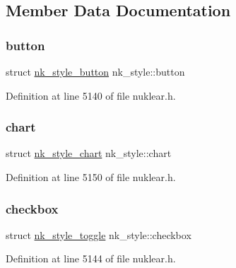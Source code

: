 \subsection{Member Data Documentation}
\mbox{\label{structnk__style_a42b97653cc5b81ff97432e40fdf47026}} 
\subsubsection{\texorpdfstring{button}{button}}
{\footnotesize\ttfamily struct \mbox{\hyperlink{structnk__style__button}{nk\+\_\+style\+\_\+button}} nk\+\_\+style\+::button}



Definition at line 5140 of file nuklear.\+h.

\mbox{\label{structnk__style_a61bfb1b8d07189d9ba529c666e42e886}} 
\subsubsection{\texorpdfstring{chart}{chart}}
{\footnotesize\ttfamily struct \mbox{\hyperlink{structnk__style__chart}{nk\+\_\+style\+\_\+chart}} nk\+\_\+style\+::chart}



Definition at line 5150 of file nuklear.\+h.

\mbox{\label{structnk__style_af3bd1c9f26bcdc34deeea5afe005b4ee}} 
\subsubsection{\texorpdfstring{checkbox}{checkbox}}
{\footnotesize\ttfamily struct \mbox{\hyperlink{structnk__style__toggle}{nk\+\_\+style\+\_\+toggle}} nk\+\_\+style\+::checkbox}



Definition at line 5144 of file nuklear.\+h.

\mbox{\label{structnk__style_ae206fbbb12d966b970cf291ca54e43ac}} 
